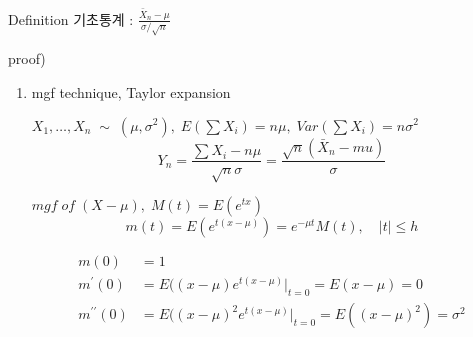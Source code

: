 \documentclass{oblivoir}
\begin{document}
\begin{itemize}
\begin{myframe}{Definition}
기초통계 : $\frac{\bar{X}_n - \mu}{\sigma / \sqrt{n}}$
\end{myframe}

proof)
\begin{enumerate}
\item mgf technique, Taylor expansion

$X_1, \ldots, X_n \; \sim \; (\mu, \sigma^2), \;E(\sum X_i) = n\mu, \; Var(\sum X_i) = n \sigma^2$
$$
Y_n = \frac{\sum X_i - n \mu}{\sqrt{n} \sigma} = \frac{\sqrt{n}(\bar{X}_n - mu)}{\sigma}
$$

$mgf \; of \; (X - \mu), \; M(t) = E(e^{tx})$
$$
m(t) = E(e^{t(x - \mu)})  = e^{-\mu t} M(t), \quad |t| \leq h
$$
\begin{myframe}{}
\begin{align*}
m(0) &= 1 \\
m^{\prime} (0) &= E((x-\mu) e^{t(x-\mu)} |_{t=0} = E(x-\mu) = 0 \\
m^{\prime\prime}(0) &= E((x-\mu)^2 e^{t(x-\mu)} |_{t=0} = E((x-\mu)^2) = \sigma^2 \\ 
\end{align*}
\end{myframe}


\end{enumerate}
\end{itemize}
\end{document}
